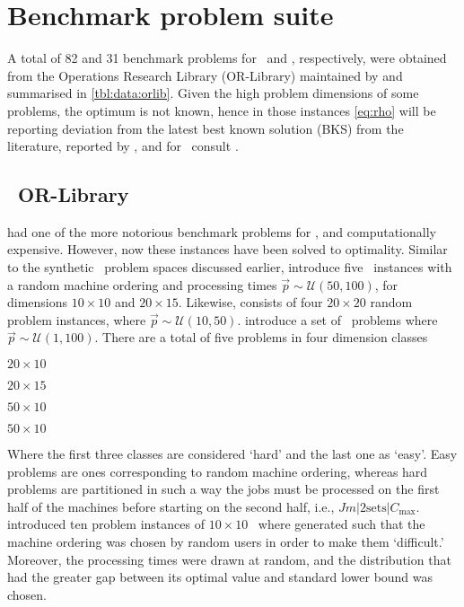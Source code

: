 \section{Benchmark problem suite}\label{sec:data:orlib}
A total of 82 and 31 benchmark problems for \JSP\ and \FSP, respectively, were 
obtained from the Operations Research Library (OR-Library) maintained by 
\citet{ORlibrary} and summarised in \cref{tbl:data:orlib}. 
Given the high problem dimensions of some problems, the optimum is not known, 
hence in those instances \cref{eq:rho} will be reporting  deviation from the 
latest best known solution (BKS) from the literature, reported by 
\citet{Jain99,orlibJSP}, and for \FSP\  consult \citet{orlibFSP}.

\subsection*{\Jsp\ OR-Library}
\citet{orlib_ft} had one of the more notorious benchmark problems for \JSP, and 
computationally expensive. However, now these instances have been solved to 
optimality. 
Similar to the synthetic \JSP\ problem spaces discussed earlier, 
\citet{orlib_abz} introduce five \JSP\ instances with a random machine ordering 
and processing times $\vec{p}\sim\mathcal{U}(50,100)$, for  dimensions 
$10\times10$ and $20\times15$. 
Likewise, \citet{orlib_yn} consists of four $20\times20$ random 
problem instances, where $\vec{p}\sim\mathcal{U}(10,50)$.
\citet{orlib_swv} introduce a set of \JSP\ problems where 
$\vec{p}\sim\mathcal{U}(1,100)$. There are a total of five problems in four 
dimension classes 
\begin{enumerate*}
  \item $20\times10$ %
  \item $20\times15$ %
  \item $50\times10$ %
  \item $50\times10$ %
\end{enumerate*}
Where the first three classes are considered `{hard}' and the last one as 
`{easy}'. Easy problems are ones corresponding to random machine ordering, 
whereas hard problems are partitioned in such a way the jobs must be processed 
on the first half of the machines before starting on the second half, i.e., 
$Jm|\text{2sets}|C_{\max}$.
\citet{orlib_orb} introduced ten problem instances of $10\times10$ \JSP\ where 
generated such that the machine ordering was chosen by random users in order to 
make them `difficult.' Moreover, the processing times were drawn at random, 
and the distribution that had the greater gap between its optimal value and 
standard lower bound was chosen. 

